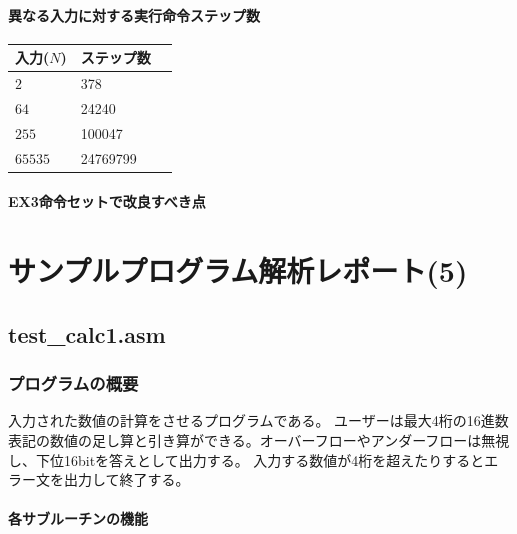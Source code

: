 \documentclass[dvipdfmx,12pt]{jreport}
\begin{document}
\subsubsection{異なる入力に対する実行命令ステップ数}
\begin{table}[h]
  \begin{tabular}{|l|l|l|} \hline
    入力($N$) & ステップ数 \\ \hline
    $2$ & 378 \\ \hline
    $64$ & 24240 \\ \hline
    $255$ & 100047 \\ \hline
    $65535$ & 24769799 \\ \hline
  \end{tabular}
\end{table}

\subsubsection{EX3命令セットで改良すべき点}



\chapter*{サンプルプログラム解析レポート(5)}
\section{test\_calc1.asm}
\subsection{プログラムの概要}
入力された数値の計算をさせるプログラムである。
ユーザーは最大4桁の16進数表記の数値の足し算と引き算ができる。オーバーフローやアンダーフローは無視し、下位16bitを答えとして出力する。
入力する数値が4桁を超えたりするとエラー文を出力して終了する。

\subsubsection{各サブルーチンの機能}
\end{document}
